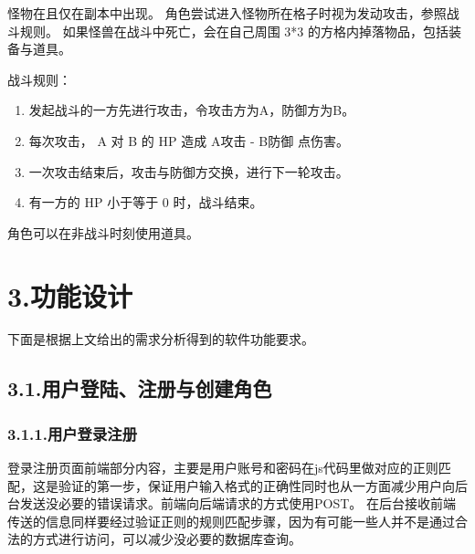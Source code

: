 \documentclass{article}
\begin{document}
\noindent{}怪物在且仅在副本中出现。 角色尝试进入怪物所在格子时视为发动攻击，参照战斗规则。 如果怪兽在战斗中死亡，会在自己周围 3*3 的方格内掉落物品，包括装备与道具。%

战斗规则：%

\begin{enumerate}[noitemsep,topsep=\mdcompacttopsep]%

\item{}发起战斗的一方先进行攻击，令攻击方为A，防御方为B。%

\item{}每次攻击， A 对 B 的 HP 造成 A攻击 - B防御 点伤害。%

\item{}一次攻击结束后，攻击与防御方交换，进行下一轮攻击。%

\item{}有一方的 HP 小于等于 0 时，战斗结束。%
\end{enumerate}%

\noindent{}角色可以在非战斗时刻使用道具。%

\section{3.\hspace*{0.5em}功能设计}\label{3}%

\noindent{}下面是根据上文给出的需求分析得到的软件功能要求。%

\subsection{3.1.\hspace*{0.5em}用户登陆、注册与创建角色}\label{31}%

\subsubsection{3.1.1.\hspace*{0.5em}用户登录注册}\label{311}%

\noindent{}登录注册页面前端部分内容，主要是用户账号和密码在js代码里做对应的正则匹配，这是验证的第一步，保证用户输入格式的正确性同时也从一方面减少用户向后台发送没必要的错误请求。前端向后端请求的方式使用POST。 在后台接收前端传送的信息同样要经过验证正则的规则匹配步骤，因为有可能一些人并不是通过合法的方式进行访问，可以减少没必要的数据库查询。%
\end{document}
